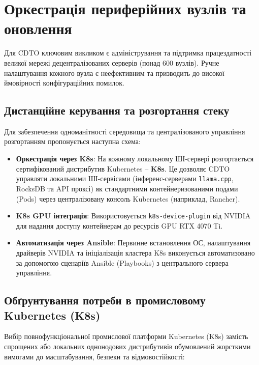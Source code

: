 \documentclass{article}
\begin{document}
\section{Оркестрація периферійних вузлів та оновлення}
Для CDTO ключовим викликом є адміністрування та підтримка працездатності великої мережі децентралізованих серверів (понад 600 вузлів). Ручне налаштування кожного вузла є неефективним та призводить до високої ймовірності конфігураційних помилок.

\subsection{Дистанційне керування та розгортання стеку}
Для забезпечення одноманітності середовища та централізованого управління розгортанням пропонується наступна схема:
\begin{itemize}
\item \textbf{Оркестрація через K8s}: На кожному локальному ШІ-сервері розгортається сертифікований дистрибутив Kubernetes -- \textbf{K8s}. Це дозволяє CDTO управляти локальними ШІ-сервісами (інференс-серверами \texttt{llama.cpp}, RocksDB та API проксі) як стандартними контейнеризованими подами (Pods) через централізовану консоль Kubernetes (наприклад, Rancher).
\item \textbf{K8s GPU інтеграція}: Використовується \texttt{k8s-device-plugin} від NVIDIA для надання доступу контейнерам до ресурсів GPU RTX 4070 Ti.
\item \textbf{Автоматизація через Ansible}: Первинне встановлення ОС, налаштування драйверів NVIDIA та ініціалізація кластера K8s виконується автоматизовано за допомогою сценаріїв Ansible (Playbooks) з центрального сервера управління.
\end{itemize}

\subsection{Обґрунтування потреби в промисловому Kubernetes (K8s)}
Вибір повнофункціональної промислової платформи Kubernetes (K8s) замість спрощених або локальних однонодових дистрибутивів обумовлений жорсткими вимогами до масштабування, безпеки та відмовостійкості:
\end{document}
